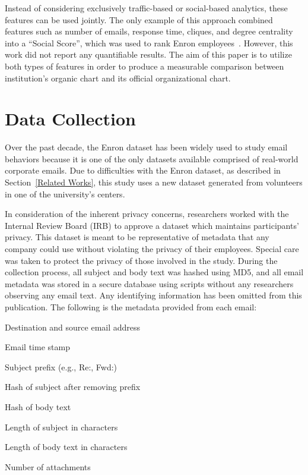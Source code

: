 \documentclass[10pt,twocolumn,conference]{IEEEtran}
\begin{document}
Instead of considering exclusively traffic-based or social-based analytics, these features can be used jointly.
The only example of this approach combined features such as number of emails, response time, cliques, and degree centrality into a ``Social Score'', which was used to rank Enron employees~\cite{rowe_automated_2007}.  
However, this work did not report any quantifiable results.
The aim of this paper is to utilize both types of features in order to produce a measurable comparison between institution's organic chart and its official organizational chart.

\section{Data Collection} \label{Data Collection}

Over the past decade, the Enron dataset has been widely used to study email behaviors because it is one of the only datasets available comprised of real-world corporate emails.
Due to difficulties with the Enron dataset, as described in Section~\ref{Related Works}, this study uses a new dataset generated from volunteers in one of the university's centers.

In consideration of the inherent privacy concerns, researchers worked with the Internal Review Board (IRB) to approve a dataset which maintains participants' privacy.
This dataset is meant to be representative of metadata that any company could use without violating the privacy of their employees.
Special care was taken to protect the privacy of those involved in the study.
During the collection process, all subject and body text was hashed using MD5, and all email metadata was stored in a secure database using scripts without any researchers observing any email text.
Any identifying information has been omitted from this publication.
The following is the metadata provided from each email:
\begin{compactitem}
\item Destination and source email address
\item Email time stamp
\item Subject prefix (e.g., Re:, Fwd:)
\item Hash of subject after removing prefix
\item Hash of body text
\item Length of subject in characters
\item Length of body text in characters
\item Number of attachments
\end{compactitem}
\end{document}
